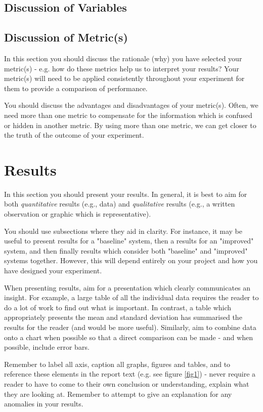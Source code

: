 \documentclass[conference]{IEEEtran}
\begin{document}
\subsection{Discussion of Variables}


\subsection{Discussion of Metric(s)}

 In this section you should discuss the rationale (why) you have selected your metric(s) - e.g. how do these metrics help us to interpret your results?  Your metric(s) will need to be applied consistently throughout your experiment for them to provide a comparison of performance.  
 
 You should discuss the advantages and disadvantages of your metric(s).  Often, we need more than one metric to compensate for the information which is confused or hidden in another metric.  By using more than one metric, we can get closer to the truth of the outcome of your experiment.  

\section{Results}

In this section you should present your results.  In general, it is best to aim for both \emph{quantitative} results (e.g., data) and \emph{qualitative} results (e.g., a written observation or graphic which is representative).  

You should use subsections where they aid in clarity.  For instance, it may be useful to present results for a "baseline" system, then a results for an "improved" system, and then finally results which consider both "baseline" and "improved" systems together.  However, this will depend entirely on your project and how you have designed your experiment.

When presenting results, aim for a presentation which clearly communicates an insight. For example, a large table of all the individual data requires the reader to do a lot of work to find out what is important.  In contrast, a table which appropriately presents the mean and standard deviation has summarised the results for the reader (and would be more useful).  Similarly, aim to combine data onto a chart when possible so that a direct comparison can be made - and when possible, include error bars.  


Remember to label all axis, caption all graphs, figures and tables, and to reference these elements in the report text (e.g. see figure \ref{fig1}) - never require a reader to have to come to their own conclusion or understanding, explain what they are looking at.  Remember to attempt to give an explanation for any anomalies in your results.  
\end{document}
